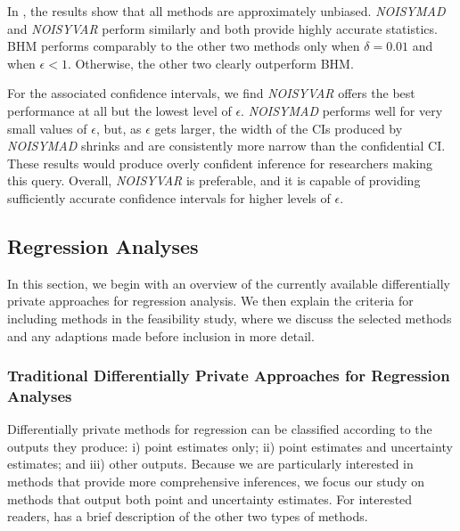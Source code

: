 In \citet{barrientos2021}, the results show that all methods are approximately unbiased. \textit{NOISYMAD} and \textit{NOISYVAR} perform similarly and both provide highly accurate statistics. BHM performs comparably to the other two methods only when $\delta = 0.01$ and when $\epsilon < 1$. Otherwise, the other two clearly outperform BHM.

For the associated confidence intervals, we find \textit{NOISYVAR} offers the best performance at all but the lowest level of $\epsilon$. \textit{NOISYMAD} performs well for very small values of $\epsilon$, but, as $\epsilon$ gets larger, the width of the CIs produced by \textit{NOISYMAD} shrinks and are consistently more narrow than the confidential CI. These results would produce overly confident inference for researchers making this query. Overall, \textit{NOISYVAR} is preferable, and it is capable of providing sufficiently accurate confidence intervals for higher levels of $\epsilon$.

\subsection{Regression Analyses}
In this section, we begin with an overview of the currently available differentially private approaches for regression analysis. We then explain the criteria for including methods in the feasibility study, where we discuss the selected methods and any adaptions made before inclusion in more detail.

\subsubsection{Traditional Differentially Private Approaches for Regression Analyses}\label{subsubsec:reg_rev}

Differentially private methods for regression can be classified according to the outputs they produce: i) point estimates only; ii) point estimates and uncertainty estimates; and  iii) other outputs. Because we are particularly interested in methods that provide more comprehensive inferences, we focus our study on methods that output both point and uncertainty estimates. For interested readers, \citet{barrientos2021} has a brief description of the other two types of methods.

